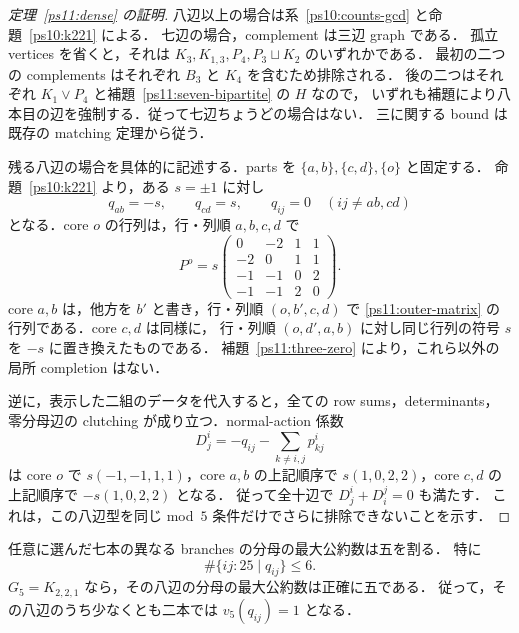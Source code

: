 \begin{proof}[定理~\ref{ps11:dense} の証明]
八辺以上の場合は系~\ref{ps10:counts-gcd} と命題~\ref{ps10:k221} による．
七辺の場合，complement は三辺 graph である．
孤立 vertices を省くと，それは $K_3,K_{1,3},P_4,P_3\sqcup K_2$ のいずれかである．
最初の二つの complements はそれぞれ $B_3$ と $K_4$ を含むため排除される．
後の二つはそれぞれ $K_1\vee P_4$ と補題~\ref{ps11:seven-bipartite} の $H$ なので，
いずれも補題により八本目の辺を強制する．従って七辺ちょうどの場合はない．
三に関する bound は既存の matching 定理から従う．

残る八辺の場合を具体的に記述する．parts を $\{a,b\},\{c,d\},\{o\}$ と固定する．
命題~\ref{ps10:k221} より，ある $s=\pm1$ に対し
\[
 q_{ab}=-s,\qquad q_{cd}=s,\qquad
 q_{ij}=0\quad(ij\ne ab,cd)
\]
となる．core $o$ の行列は，行・列順 $a,b,c,d$ で
\begin{equation}\label{ps11:central-matrix}
 P^o=s\begin{pmatrix}
 0&-2&1&1\\
 -2&0&1&1\\
 -1&-1&0&2\\
 -1&-1&2&0
 \end{pmatrix}.
\end{equation}
core $a,b$ は，他方を $b'$ と書き，行・列順 $(o,b',c,d)$ で
\eqref{ps11:outer-matrix} の行列である．core $c,d$ は同様に，
行・列順 $(o,d',a,b)$ に対し同じ行列の符号 $s$ を $-s$ に置き換えたものである．
補題~\ref{ps11:three-zero} により，これら以外の局所 completion はない．

逆に，表示した二組のデータを代入すると，全ての row sums，determinants，
零分母辺の clutching が成り立つ．normal-action 係数
\[
 D^i_j=-q_{ij}-\sum_{k\ne i,j}p^i_{kj}
\]
は core $o$ で $s(-1,-1,1,1)$，core $a,b$ の上記順序で
$s(1,0,2,2)$，core $c,d$ の上記順序で $-s(1,0,2,2)$ となる．
従って全十辺で $D^i_j+D^j_i=0$ も満たす．
これは，この八辺型を同じ mod~$5$ 条件だけでさらに排除できないことを示す．
\end{proof}

\begin{corollary}[七分母の共通因子の指数]\label{ps11:dense-gcd}
任意に選んだ七本の異なる branches の分母の最大公約数は五を割る．
特に
\[
 \#\{ij:25\mid q_{ij}\}\le6.
\]
$G_5=K_{2,2,1}$ なら，その八辺の分母の最大公約数は正確に五である．
従って，その八辺のうち少なくとも二本では $v_5(q_{ij})=1$ となる．
\end{corollary}

